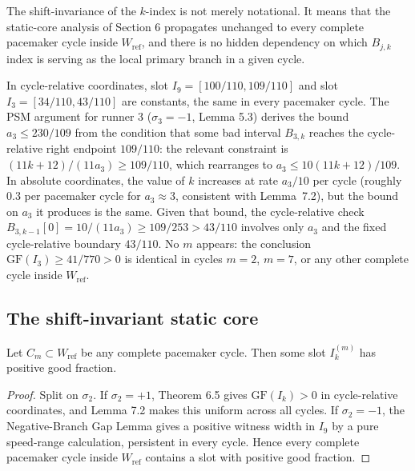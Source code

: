 \documentclass[12pt]{article}
\begin{document}
\begin{remark}
The shift-invariance of the $k$-index is not merely notational. It means that the static-core analysis of Section 6 propagates unchanged to every complete pacemaker cycle inside $W_{\mathrm{ref}}$, and there is no hidden dependency on which $B_{j,k}$ index is serving as the local primary branch in a given cycle.
\end{remark}

\begin{example} In cycle-relative coordinates, slot
$I_9=[100/110,109/110]$ and slot $I_3=[34/110,43/110]$ are constants, the same in every
pacemaker cycle. The PSM argument for runner 3 ($\sigma_3=-1$, Lemma 5.3) derives the
bound $a_3\le 230/109$ from the condition that some bad interval $B_{3,k}$ reaches the
cycle-relative right endpoint $109/110$: the relevant constraint is
$(11k+12)/(11a_3)\ge 109/110$, which rearranges to $a_3\le 10(11k+12)/109$.
In absolute coordinates, the value of $k$ increases at rate $a_3/10$ per cycle
(roughly $0.3$ per pacemaker cycle for $a_3\approx 3$, consistent with Lemma~7.2), but
the bound on $a_3$ it produces is the same. Given that bound, the cycle-relative check
$B_{3,k-1}[0]=10/(11a_3)\ge 109/253>43/110$ involves only $a_3$ and the fixed
cycle-relative boundary $43/110$. No $m$ appears: the conclusion
$\mathrm{GF}(I_3)\ge 41/770>0$ is identical in cycles $m=2$, $m=7$, or any other
complete cycle inside $W_{\mathrm{ref}}$.
\end{example}

\subsection{The shift-invariant static core}

\begin{theorem}\label{t:73}
Let $C_m\subset W_{\mathrm{ref}}$ be any
complete pacemaker cycle. Then some slot $I_k^{(m)}$ has positive good fraction.

\end{theorem}
\begin{proof}
Split on $\sigma_2$. If $\sigma_2=+1$, Theorem 6.5 gives $\mathrm{GF}(I_k)>0$ in
cycle-relative coordinates, and Lemma 7.2 makes this uniform across all cycles. If
$\sigma_2=-1$, the Negative-Branch Gap Lemma gives a positive witness width in $I_9$ by
a pure speed-range calculation, persistent in every cycle. Hence every complete pacemaker
cycle inside $W_{\mathrm{ref}}$ contains a slot with positive good fraction.
\end{proof}
\end{document}
